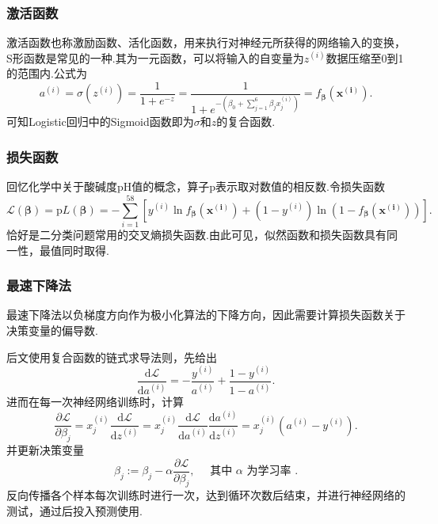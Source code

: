 \subsubsection{激活函数}

激活函数也称激励函数、活化函数，用来执行对神经元所获得的网络输入的变换，S形函数是常见的一种.其为一元函数，可以将输入的自变量为$z^{(i)}$数据压缩至0到1的范围内.公式为
\begin{equation}
	a^{(i)} = \sigma (z^{(i)}) = \frac{1}{1 + e^{- z}} = \frac{1}{1 + e^{-
   \left( \beta_0 + \sum^6_{j = 1} \beta_j x^{(i)}_j \right)}} =
   f_{\boldsymbol{\beta}} (\boldsymbol{x^{(i)}}).
\end{equation}
可知Logistic回归中的Sigmoid函数即为$\sigma$和$z$的复合函数.

\subsubsection{损失函数}

回忆化学中关于酸碱度pH值的概念，算子p表示取对数值的相反数.令损失函数
\begin{equation}
	\mathcal{L} (\boldsymbol{\beta}) = \mathrm{p} \textit{L$(\boldsymbol{\beta})$}
   = - \sum_{i = 1}^{58} [y^{(i)} \ln f_{\boldsymbol{\beta}}
   (\boldsymbol{x^{(i)}}) + (1 - y^{(i)}) \ln (1 - f_{\boldsymbol{\beta}}
   (\boldsymbol{x^{(i)}}))].
\end{equation}
恰好是二分类问题常用的交叉熵损失函数.由此可见，似然函数和损失函数具有同一性，最值同时取得.

\subsubsection{最速下降法}

最速下降法以负梯度方向作为极小化算法的下降方向，因此需要计算损失函数关于决策变量的偏导数.

后文使用复合函数的链式求导法则，先给出
\begin{equation}
	\frac{\mathrm{d} \mathcal{L}}{\mathrm{d} a^{(i)}} = -
   \frac{y^{(i)}}{a^{(i)}} + \frac{1 - y^{(i)}}{1 - a^{(i)}}.
\end{equation}
进而在每一次神经网络训练时，计算
\begin{equation}
	\frac{\partial \mathcal{L}}{\partial \beta_j} = x^{(i)}_j \frac{\mathrm{d}
   \mathcal{L}}{\mathrm{d}z^{(i)}} = x^{(i)}_j \frac{\mathrm{d}
   \mathcal{L}}{\mathrm{d} a^{(i)}} \frac{\mathrm{d} a^{(i)}}{\mathrm{d}z^{(i)}}
   = x^{(i)}_j (a^{(i)} - y^{(i)}).
\end{equation}
并更新决策变量
\begin{equation}
	\beta_{j}:=\beta_{j}-\alpha \frac{\partial \mathcal{L}}{\partial \beta_{j}}, \quad \text { 其中 } \alpha \text { 为学习率 }.
\end{equation}
反向传播各个样本每次训练时进行一次，达到循环次数后结束，并进行神经网络的测试，通过后投入预测使用.

